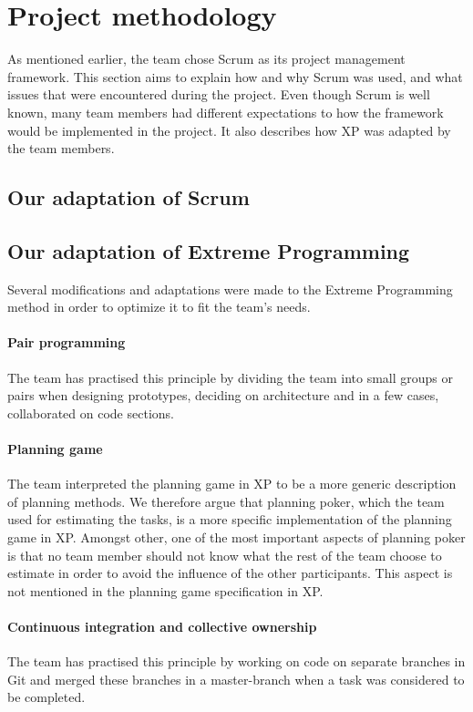 \section{Project methodology}
As mentioned earlier, the team chose Scrum as its project management framework. This section aims to explain how and why Scrum was used, and what issues that were encountered during the project. Even though Scrum is well known, many team members had different expectations to how the framework would be implemented in the project. It also describes how XP was adapted by the team members.

\subsection{Our adaptation of Scrum}



\subsection{Our adaptation of Extreme Programming}
Several modifications and adaptations were made to the Extreme Programming method in order to optimize it to fit the team's needs.

\paragraph{Pair programming}
The team has practised this principle by dividing the team into small groups or pairs when designing prototypes, deciding on architecture and in a few cases, collaborated on code sections.

\paragraph{Planning game}
The team interpreted the planning game in XP to be a more generic description of planning methods. We therefore argue that planning poker, which the team used for estimating the tasks, is a more specific implementation of the planning game in XP. Amongst other, one of the most important aspects of planning poker is that no team member should not know what the rest of the team choose to estimate in order to avoid the influence of the other participants. This aspect is not mentioned in the planning game specification in XP.

\paragraph{Continuous integration and collective ownership}
The team has practised this principle by working on code on separate branches in Git and merged these branches in a master-branch when a task was considered to be completed.

